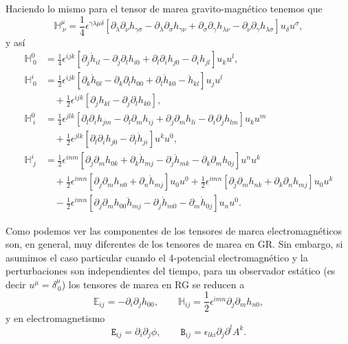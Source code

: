 Haciendo lo mismo para el tensor de marea gravito-magnético tenemos que
\begin{equation}
\mathbb{H}^{\mu}_{\ \nu} = \frac{1}{4} \epsilon^{\gamma \lambda \mu \delta} \left[ \partial_{\lambda} \partial_{\nu} h_{\gamma \sigma} - \partial_{\lambda} \partial_{\sigma} h_{\gamma \nu} + \partial_{\sigma} \partial_{\gamma} h_{\lambda \nu} - \partial_{\nu} \partial_{\gamma} h_{\lambda \sigma} \right] u_{\delta} u^{\sigma},
\end{equation} 
y así
\begin{align}
\mathbb{H}^{0}_{\ 0} &= \frac{1}{4} \epsilon^{ijk} \left[ \partial_j \dot{h}_{il} - \partial_{j} \partial_l h_{i0} + \partial_l \partial_i h_{j0} -  \partial_i h_{jl} \right] u_k u^l, \\
\nonumber
\mathbb{H}^{i}_{\ 0} &= \frac{1}{2} \epsilon^{ijk} \left[ \partial_k \dot{h}_{0l} - \partial_k \partial_l h_{00} + \partial_l \dot{h}_{k0} - \ddot{h}_{kl} \right] u_j u^l \\
& \quad + \frac{1}{2} \epsilon^{ijk} \left[ \partial_j h_{kl} - \partial_j \partial_l h_{k0} \right],\\
\nonumber
\mathbb{H}^{0}_{\ i} &= \frac{1}{4} \epsilon^{jlk} \left[ \partial_l \partial_i h_{jm} - \partial_l \partial_m h_{ij} + \partial_j \partial_m h_{li} - \partial_i \partial_j h_{lm} \right] u_k u^m \\
& \quad + \frac{1}{2} \epsilon^{jlk} \left[ \partial_l \partial_i h_{j0} - \partial_l \dot{h}_{ji} \right] u^k u^0,\\
\nonumber
\mathbb{H}^{i}_{\ j} &= \frac{1}{2} \epsilon^{inm} \left[ \partial_j \partial_m h_{0k} + \partial_k \dot{h}_{mj} - \partial_j \dot{h}_{mk} - \partial_k \partial_m h_{0j} \right] u^n u^k \\
\nonumber
& \quad + \frac{1}{2} \epsilon^{imn} \left[ \partial_j \partial_m h_{n0} + \partial_n \dot{h}_{mj} \right] u_0 u^0 
+ \frac{1}{2} \epsilon^{imn} \left[ \partial_j \partial_m h_{nk} + \partial_k \partial_n h_{mj} \right]
u_0 u^k \\
& \quad - \frac{1}{2} \epsilon^{imn} \left[ \partial_j \partial_m h_{00} \ddot{h}_{mj} - \partial_j \dot{h}_{m0} - \partial_m \dot{h}_{0j} \right] u_n u^0.
\end{align}

Como podemos ver las componentes de los tensores de marea electromagnéticos son, en general, muy diferentes de los tensores de marea en GR. Sin embargo, si asumimos el caso particular cuando el 4-potencial electromagnético y la perturbaciones son independientes del tiempo, para un observador estático (es decir $u^{\mu} = \delta^{\mu}_{\ 0}$) los tensores de marea en RG se reducen a
\begin{equation}
\label{eq:60}
\mathbb{E}_{ij} = - \partial_i \partial_j h_{00}, \qquad \mathbb{H}_{ij} = \frac{1}{2} \epsilon^{imn} \partial_j \partial_m h_{n0},
\end{equation}
y en electromagnetismo
\begin{equation}
\label{eq:61}
\mathtt{E}_{ij} = \partial_i \partial_j \phi, \qquad \mathtt{B}_{ij} = \epsilon_{lki} \partial_j \partial^l A^k. 
\end{equation}

